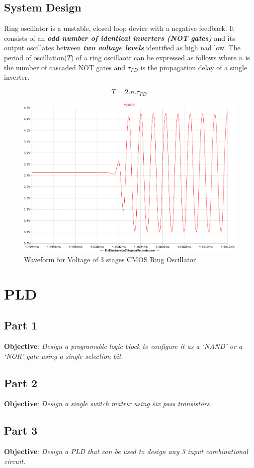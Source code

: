 \documentclass[a4paper,11pt]{article}%
\begin{document}
\subsection{System Design}
Ring oscillator is a unstable, closed loop device with a negative feedback. It consists of an \textbf{\textit{odd number of identical inverters (NOT gates)}} and its output oscillates between\textbf{\textit{ two voltage levels}} identified as high nad low. The period of oscillation($T$) of a ring oscillaotr can be expressed as follows where $n$ is the number of cascaded NOT gates and $\tau_{PD}$ is the propagation delay of a single inverter.

\[
T = 2.n.\tau_{PD}
\]

\begin{figure}[!h]
\centering
\includegraphics[scale=0.6]{figures/cct1plot1}
\caption{Waveform for Voltage of 3 stages CMOS Ring Oscillator}

\end{figure}


\pagebreak
\section{PLD}
\subsection{Part 1}
\textbf{Objective}: \textit{Design a programable logic block to configure it as a `NAND' or a `NOR' gate using a single selection bit.}\\

\subsection{Part 2}
\textbf{Objective}: \textit{Design a single switch matrix using six pass transistors.}\\

\subsection{Part 3}
\textbf{Objective}: \textit{Design a PLD that can be used to design any 3 input
combinational circuit.}\\


%
%

\end{document}
